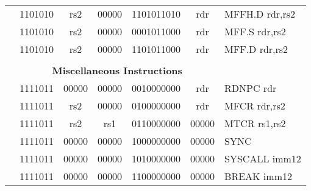 \begin{table}[p]
\begin{small}
\begin{center}
\begin{tabular}{rcccccccccl}
&
\multicolumn{2}{|c|}{1101010} &
\multicolumn{1}{c|}{rs2} &
\multicolumn{1}{c|}{00000} &
\multicolumn{4}{c|}{1101011010} &
\multicolumn{1}{c|}{rdr} & MFFH.D rdr,rs2 \\
\cline{2-10}
  

&
\multicolumn{2}{|c|}{1101010} &
\multicolumn{1}{c|}{rs2} &
\multicolumn{1}{c|}{00000} &
\multicolumn{4}{c|}{0001011000} &
\multicolumn{1}{c|}{rdr} & MFF.S rdr,rs2 \\
\cline{2-10}
  

&
\multicolumn{2}{|c|}{1101010} &
\multicolumn{1}{c|}{rs2} &
\multicolumn{1}{c|}{00000} &
\multicolumn{4}{c|}{1101011000} &
\multicolumn{1}{c|}{rdr} & MFF.D rdr,rs2 \\
\cline{2-10}
  

&
\multicolumn{9}{c}{} & \\
&
\multicolumn{9}{c}{\bf Miscellaneous Instructions} & \\
\cline{2-10}
  

&
\multicolumn{2}{|c|}{1111011} &
\multicolumn{1}{c|}{00000} &
\multicolumn{1}{c|}{00000} &
\multicolumn{4}{c|}{0010000000} &
\multicolumn{1}{c|}{rdr} & RDNPC rdr \\
\cline{2-10}
  

&
\multicolumn{2}{|c|}{1111011} &
\multicolumn{1}{c|}{rs2} &
\multicolumn{1}{c|}{00000} &
\multicolumn{4}{c|}{0100000000} &
\multicolumn{1}{c|}{rdr} & MFCR rdr,rs2 \\
\cline{2-10}
  

&
\multicolumn{2}{|c|}{1111011} &
\multicolumn{1}{c|}{rs2} &
\multicolumn{1}{c|}{rs1} &
\multicolumn{4}{c|}{0110000000} &
\multicolumn{1}{c|}{00000} & MTCR rs1,rs2 \\
\cline{2-10}
  

&
\multicolumn{2}{|c|}{1111011} &
\multicolumn{1}{c|}{00000} &
\multicolumn{1}{c|}{00000} &
\multicolumn{4}{c|}{1000000000} &
\multicolumn{1}{c|}{00000} & SYNC  \\
\cline{2-10}
  

&
\multicolumn{2}{|c|}{1111011} &
\multicolumn{1}{c|}{00000} &
\multicolumn{1}{c|}{00000} &
\multicolumn{4}{c|}{1010000000} &
\multicolumn{1}{c|}{00000} & SYSCALL imm12 \\
\cline{2-10}
  

&
\multicolumn{2}{|c|}{1111011} &
\multicolumn{1}{c|}{00000} &
\multicolumn{1}{c|}{00000} &
\multicolumn{4}{c|}{1100000000} &
\multicolumn{1}{c|}{00000} & BREAK imm12 \\
\cline{2-10}
  


\end{tabular}
\end{center}
\end{small}
\end{table}
